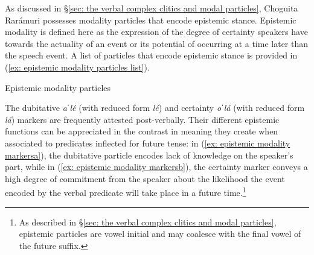 

As discussed in §\ref{sec: the verbal complex clitics and modal particles}, Choguita Rarámuri possesses modality particles that encode epistemic stance. Epistemic modality is defined here as the expression of the degree of certainty speakers have towards the actuality of an event or its potential of occurring at a time later than the speech event. A list of particles that encode epistemic stance is provided in (\ref{ex: epistemic modality particles list}).

\ea\label{ex: epistemic modality particles list}
{Epistemic modality particles}

    \z
\z

The dubitative \textit{aˈlé} (with reduced form \textit{lé}) and certainty \textit{oˈlá} (with reduced form \textit{lá}) markers are frequently attested post-verbally. Their different epistemic functions can be appreciated in the contrast in meaning they create when associated to predicates inflected for future tense: in (\ref{ex: epistemic modality markersa}), the dubitative particle encodes lack of knowledge on the speaker's part, while in (\ref{ex: epistemic modality markersb}), the certainty marker conveys a high degree of commitment from the speaker about the likelihood the event encoded by the verbal predicate will take place in a future time.\footnote{As described in §\ref{sec: the verbal complex clitics and modal particles}, epistemic particles are vowel initial and may coalesce with the final vowel of the future suffix.}

